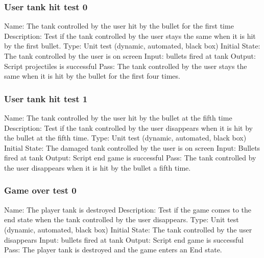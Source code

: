 \documentclass{article}
\begin{document}
\subsubsection{User tank hit test 0}
Name: The tank controlled by the user hit by the bullet for the first time
\newline
Description: Test if the tank controlled by the user stays the same when it is 
hit by the first bullet. \newline
Type: Unit test (dynamic, automated, black box) \newline
Initial State:  The tank controlled by the user is on screen \newline
Input: bullets fired at tank\newline
Output: Script projectiles is successful  \newline
Pass: The tank controlled by the user stays the same when it is hit by the 
bullet for the first four times. \newline

\subsubsection{User tank hit test 1}
Name:  The tank controlled by the user hit by the bullet at the fifth time
\newline
Description: Test if the tank controlled by the user disappears when it is hit 
by the bullet at the fifth time. \newline
Type: Unit test (dynamic, automated, black box) \newline
Initial State:  The damaged tank controlled by the user is on screen
 \newline
Input: Bullets fired at tank\newline
Output: Script end game is successful\newline
Pass: The tank controlled by the user disappears when it is hit by the bullet 
a fifth time. \newline

\subsubsection{Game over test 0}
Name:  The player tank is destroyed\newline
Description: Test if the game comes to the end state when the tank controlled 
by the user disappears. \newline
Type: Unit test (dynamic, automated, black box) \newline
Initial State:  The tank controlled by the user disappears\newline
Input: bullets fired at tank\newline
Output: Script end game is successful\newline
Pass:  The player tank is destroyed and the game enters an End state. \newline
\end{document}
